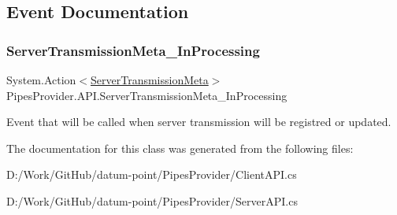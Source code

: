 \subsection{Event Documentation}
\mbox{\label{class_pipes_provider_1_1_a_p_i_a88d536e98d1ea1c34d4331fef67a7561}} 
\subsubsection{\texorpdfstring{Server\+Transmission\+Meta\+\_\+\+In\+Processing}{ServerTransmissionMeta\_InProcessing}}
{\footnotesize\ttfamily System.\+Action$<$\mbox{\hyperlink{class_pipes_provider_1_1_server_transmission_meta}{Server\+Transmission\+Meta}}$>$ Pipes\+Provider.\+A\+P\+I.\+Server\+Transmission\+Meta\+\_\+\+In\+Processing\hspace{0.3cm}{\ttfamily [static]}}



Event that will be called when server transmission will be registred or updated. 



The documentation for this class was generated from the following files\+:\begin{DoxyCompactItemize}
\item 
D\+:/\+Work/\+Git\+Hub/datum-\/point/\+Pipes\+Provider/Client\+A\+P\+I.\+cs\item 
D\+:/\+Work/\+Git\+Hub/datum-\/point/\+Pipes\+Provider/Server\+A\+P\+I.\+cs\end{DoxyCompactItemize}
